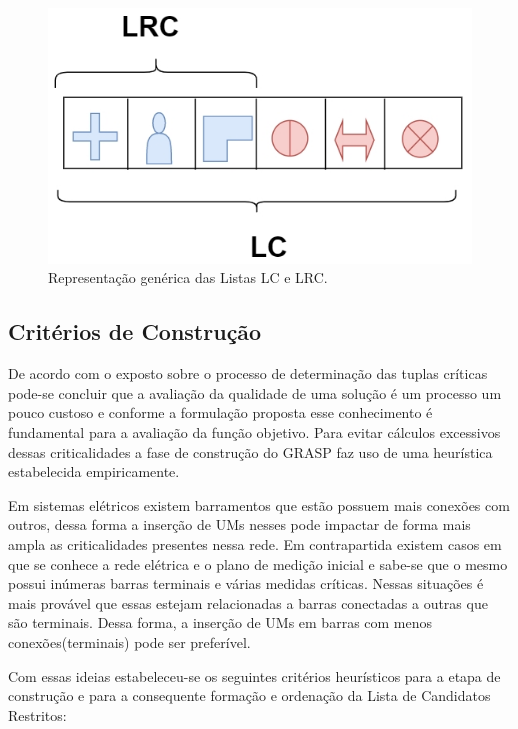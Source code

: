 \documentclass[12pt]{article}
\begin{document}
\begin{figure}[H]
	\centering 
	\includegraphics[scale=0.6]{figuras/LC_LRC.jpg}
	\caption{Representação genérica das Listas LC e LRC.}
	\label{fig8} %
\end{figure}

\subsection{Critérios de Construção}

De acordo com o exposto sobre o processo de determinação das tuplas críticas pode-se concluir que a avaliação da qualidade de uma solução é um processo um pouco custoso e conforme a formulação proposta esse conhecimento é fundamental para a avaliação da função objetivo. Para evitar cálculos excessivos dessas criticalidades a fase de construção do GRASP faz uso de uma heurística estabelecida empiricamente.

Em sistemas elétricos existem barramentos que estão possuem mais conexões com outros, dessa forma a inserção de UMs nesses pode impactar de forma mais ampla as criticalidades presentes nessa rede. Em contrapartida existem casos em que se conhece a rede elétrica e o plano de medição inicial e sabe-se que o mesmo possui inúmeras barras terminais e várias medidas críticas. Nessas situações é mais provável que essas estejam relacionadas a barras conectadas a outras que são terminais. Dessa forma, a inserção de UMs em barras com menos conexões(terminais) pode ser preferível.

Com essas ideias estabeleceu-se os seguintes critérios heurísticos para a etapa de construção e para a consequente formação e ordenação da Lista de Candidatos Restritos:
\end{document}
